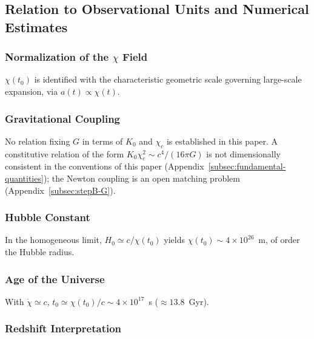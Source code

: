 \subsection{Relation to Observational Units and Numerical Estimates}
  \label{subsec:observational-estimates}

  \subsubsection*{Normalization of the
  \texorpdfstring{$\chi$}{χ} Field}
    \label{subsec:normalization-of-the-chi-field}

    $\chi(t_0)$ is identified with the characteristic geometric scale
    governing large-scale expansion, via $a(t) \propto \chi(t)$.

  \subsubsection*{Gravitational Coupling}
    \label{subsec:K0-chic-constraints}

    No relation fixing $G$ in terms of $K_0$ and $\chi_c$ is established in this paper.
    A constitutive relation of the form $K_0 \chi_c^2 \sim c^4/(16\pi G)$ is not dimensionally consistent in the
    conventions of this paper (Appendix~\ref{subsec:fundamental-quantities}); the Newton coupling is an open matching
    problem
    (Appendix~\ref{subsec:stepB-G}).

  \subsubsection*{Hubble Constant}
    \label{subsec:hubble-constant}

    In the homogeneous limit,
    $H_0 \simeq c/\chi(t_0)$ yields
    $\chi(t_0) \sim 4 \times 10^{26}$~m, of order the Hubble radius.

  \subsubsection*{Age of the Universe}
    \label{subsec:age-of-the-universe}

    With $\dot{\chi} \simeq c$,
    $t_0 \simeq \chi(t_0)/c
    \sim 4 \times 10^{17}$~s ($\approx 13.8$~Gyr).

  \subsubsection*{Redshift Interpretation}
    \label{subsec:redshift-interpretation}

